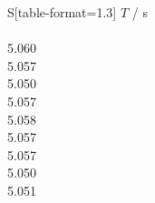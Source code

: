 \begin{subtable}{0.18\textwidth}
\centering
{}
\label{tab:magnet3-5}
\begin{tabular}{S[table-format=1.3]}
\toprule
{$T$ / s} \\
 \\
5.060 \\
5.057 \\
5.050 \\
5.057 \\
5.058 \\
5.057 \\
5.057 \\
5.050 \\
5.051 \\
\bottomrule
\end{tabular}
\end{subtable}